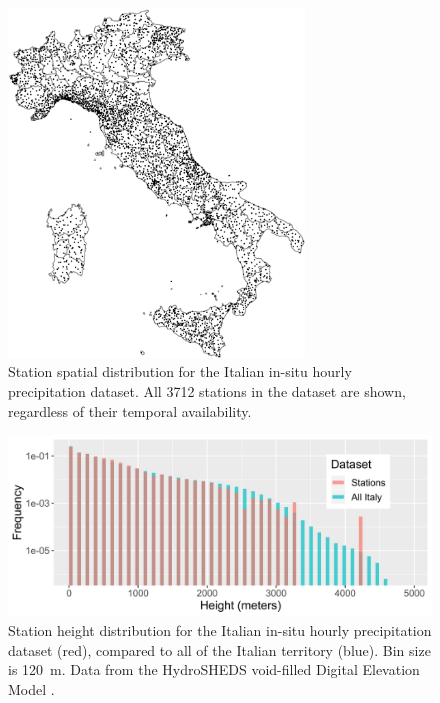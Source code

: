 \begin{figure}
    \centering
    \includegraphics[width=0.7\textwidth]{figures/rain_dst/stat_pos.png}
    \decoRule
    \caption[Station spatial distribution for the Italian in-situ hourly precipitation dataset GRIPHO]{Station spatial distribution for the Italian in-situ hourly precipitation dataset. All 3712 stations in the dataset are shown, regardless of their temporal availability.}
    \label{fig:stat_pos}
\end{figure}

\begin{figure}
    \centering
    \includegraphics[width=\textwidth]{figures/rain_dst/stat_distr_height.png}
    \decoRule
    \caption[Station height distribution for the Italian in-situ hourly  precipitation dataset GRIPHO]{Station height distribution for the Italian in-situ hourly precipitation dataset (red), compared to all of the Italian territory (blue). Bin size is \SI{120}{m}. Data from the HydroSHEDS void-filled Digital Elevation Model \citep{Lehner2008, Lehner2013}.}
    \label{fig:stat_distr_height}
\end{figure}


